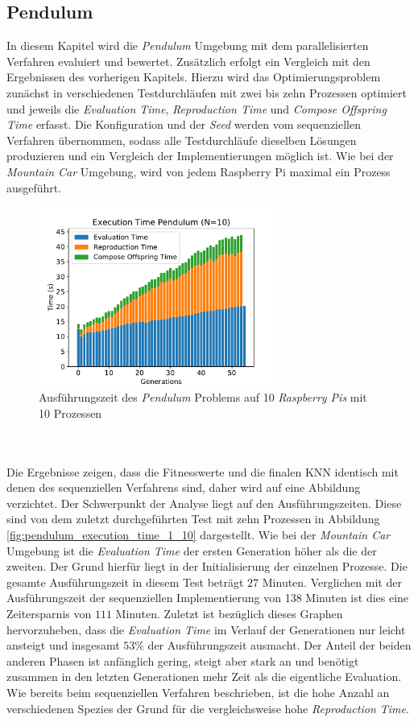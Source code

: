 \subsection{Pendulum}
In diesem Kapitel wird die \emph{Pendulum} Umgebung mit dem parallelisierten Verfahren evaluiert und bewertet. Zusätzlich erfolgt ein Vergleich mit den Ergebnissen des vorherigen Kapitels. Hierzu wird das Optimierungsproblem zunächst in verschiedenen Testdurchläufen mit zwei bis zehn Prozessen optimiert und jeweils die \emph{Evaluation Time}, \emph{Reproduction Time} und \emph{Compose Offspring Time} erfasst. Die Konfiguration und der \emph{Seed} werden vom sequenziellen Verfahren übernommen, sodass alle Testdurchläufe dieselben Lösungen produzieren und ein Vergleich der Implementierungen möglich ist. Wie bei der \emph{Mountain Car} Umgebung, wird von jedem Raspberry Pi maximal ein Prozess ausgeführt. 
\begin{figure}[!htb]
	\centering
	\includegraphics[width=0.7\textwidth]{./img/pendulum_analysis/pendulum_time_1_10core_10pi.pdf} 
	\caption{Ausführungszeit des \emph{Pendulum} Problems auf 10 \emph{Raspberry Pis} mit 10 Prozessen}
	\label{fig:pendulum_time_10cores_10pi}
\end{figure}
\\\\
Die Ergebnisse zeigen, dass die Fitnesswerte und die finalen \ac{KNN} identisch mit denen des sequenziellen Verfahrens sind, daher wird auf eine Abbildung verzichtet. Der Schwerpunkt der Analyse liegt auf den Ausführungszeiten. Diese sind von dem zuletzt durchgeführten Test mit zehn Prozessen in Abbildung \ref{fig:pendulum_execution_time_1_10} dargestellt. Wie bei der \emph{Mountain Car} Umgebung ist die \emph{Evaluation Time} der ersten Generation höher als die der zweiten. Der Grund hierfür liegt in der Initialisierung der einzelnen Prozesse. Die gesamte Ausführungszeit in diesem Test beträgt $27$ Minuten. Verglichen mit der Ausführungszeit der sequenziellen Implementierung von 138 Minuten ist dies eine Zeitersparnis von $111$ Minuten. Zuletzt ist bezüglich dieses Graphen hervorzuheben, dass die \emph{Evaluation Time} im Verlauf der Generationen nur leicht ansteigt und insgesamt $53\%$ der Ausführungszeit ausmacht. Der Anteil der beiden anderen Phasen ist anfänglich gering, steigt aber stark an und benötigt zusammen in den letzten Generationen mehr Zeit als die eigentliche Evaluation. Wie bereits beim sequenziellen Verfahren beschrieben, ist die hohe Anzahl an verschiedenen Spezies der Grund für die vergleichsweise hohe \emph{Reproduction Time}.
